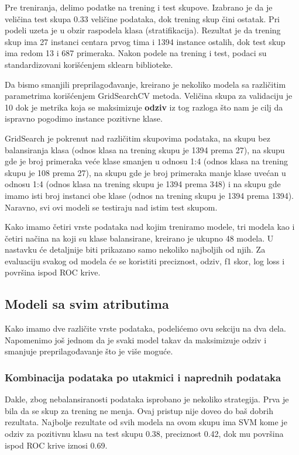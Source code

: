 \documentclass[a4paper]{article}
\begin{document}
Pre treniranja, delimo podatke na trening i test skupove. Izabrano je da je
veličina test skupa 0.33 veličine podataka, dok trening skup čini ostatak. Pri
podeli uzeta je u obzir raspodela klasa (stratifikacija). Rezultat je da trening skup ima 27 instanci centara prvog tima i 1394 instance ostalih, dok test skup ima redom 13 i 687 primeraka. Nakon podele na trening i test, podaci su standardizovani korišćenjem sklearn biblioteke.

Da bismo smanjili preprilagođavanje, kreirano je nekoliko modela sa različitim parametrima korišćenjem GridSearchCV metoda. Veličina skupa za validaciju je 10 dok je metrika koja se maksimizuje \textbf{odziv} iz tog razloga što nam je cilj da ispravno pogodimo instance pozitivne klase.

GridSearch je pokrenut nad različitim skupovima podataka, na skupu bez
balansiranja klasa (odnos klasa na trening skupu je 1394 prema 27), na skupu
gde je broj primeraka veće klase smanjen u odnosu 1:4 (odnos klasa na trening
skupu je 108 prema 27), na skupu gde je broj primeraka manje klase uvećan u
odnosu 1:4 (odnos klasa na trening skupu je 1394 prema 348) i na skupu gde
imamo isti broj instanci obe klase (odnos na trening skupu je 1394 prema 1394).
Naravno, svi ovi modeli se testiraju nad istim test skupom.

Kako imamo četiri vrste podataka nad kojim treniramo modele, tri modela
kao i četiri načina na koji su klase balansirane, kreirano je ukupno 48 modela. U
nastavku će detaljnije biti prikazano samo nekoliko najboljih od njih. Za evaluaciju svakog od modela će se koristiti preciznost, odziv, f1 skor, log loss i površina ispod ROC krive.

\subsection{Modeli sa svim atributima}
\label{subsec:svi_atributi}

Kako imamo dve različite vrste podataka, podelićemo ovu sekciju na dva dela. Napomenimo još jednom da je svaki model takav da maksimizuje odziv i smanjuje preprilagođavanje što je više moguće.

\subsubsection{Kombinacija podataka po utakmici i naprednih podataka}
\label{subsubsec:kombo_pg_adv}

Dakle, zbog nebalansiranosti podataka isprobano je nekoliko strategija. Prva
je bila da se skup za trening ne menja. Ovaj pristup nije doveo do baš dobrih
rezultata. Najbolje rezultate od svih modela na ovom skupu ima SVM kome je
odziv za pozitivnu klasu na test skupu 0.38, preciznost 0.42, dok mu površina
ispod ROC krive iznosi 0.69.
\end{document}
